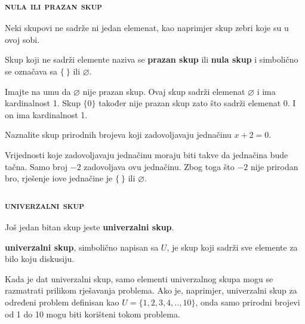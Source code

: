 \documentclass[a4paper,14pt,svgnames]{article}
\newcounter{counter}
\newcommand{\examplecounter}{\textbf{\refstepcounter{counter}PRIMJER \thecounter}}
\begin{document}
\subsubsection{\textsc{nula ili prazan skup}}
Neki skupovi ne sadrže ni jedan elemenat, kao naprimjer skup zebri koje su u ovoj sobi.
\begin{tcolorbox}
Skup koji ne sadrži elemente naziva se \textbf{prazan skup} ili \textbf{nula skup} i simbolično se označava sa $\{\ \}$ ili $\varnothing$.
\end{tcolorbox}
Imajte na umu da ${\varnothing}$ nije prazan skup. Ovaj skup sadrži elemenat $\varnothing$ i ima kardinalnost 1. Skup $\{0\}$ također nije prazan skup zato što sadrži elemenat $0$. I on ima kardinalnost 1.
\begin{tcolorbox}[title=\large \examplecounter \hfill\small\textbf{"Rješenja prirodnih brojeva"}]
Naznalite skup prirodnih brojeva koji zadovoljavaju jednačinu $x+2=0$.
\begin{tcolorbox}[title=\small \textbf{RJEŠENJE},colback=white]
\begin{center}
Vrijednosti koje zadovoljavaju jednačinu moraju biti takve da jednačina bude tačna. Samo broj $-2$ zadovoljava ovu jednačinu. Zbog toga što $-2$ nije prirodan bro, rješenje iove jednačine je $\{\ \}$ ili $\varnothing$.
\end{center}
\end{tcolorbox}
\end{tcolorbox}

\subsubsection{\textsc{univerzalni skup}}
Još jedan bitan skup jeste \textbf{univerzalni skup}.
\begin{tcolorbox}
\textbf{univerzalni skup}, simbolično napisan sa $U$, je skup koji sadrži sve elemente za bilo koju diskusiju.
\end{tcolorbox}
Kada je dat univerzalni skup, samo elementi univerzalnog skupa mogu se razmatrati prilikom rješavanja problema. Ako je, naprimjer, univerzalni skup za određeni problem definisan kao $U=\{1, 2, 3, 4, .., 10\}$, onda samo prirodni brojevi od 1 do 10 mogu biti korišteni tokom problema.
\end{document}
